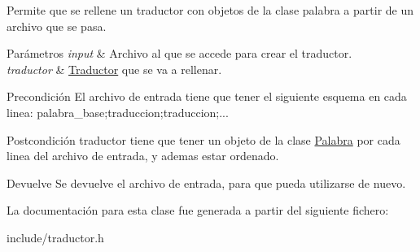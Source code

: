 \-Permite que se rellene un traductor con objetos de la clase palabra a partir de un archivo que se pasa. 
\begin{DoxyParams}{\-Parámetros}
{\em input} & \-Archivo al que se accede para crear el traductor. \\
\hline
{\em traductor} & \hyperlink{classTraductor}{\-Traductor} que se va a rellenar. \\
\hline
\end{DoxyParams}
\begin{DoxyPrecond}{\-Precondición}
\-El archivo de entrada tiene que tener el siguiente esquema en cada linea\-: palabra\-\_\-base;traduccion;traduccion;... 
\end{DoxyPrecond}
\begin{DoxyPostcond}{\-Postcondición}
traductor tiene que tener un objeto de la clase \hyperlink{classPalabra}{\-Palabra} por cada linea del archivo de entrada, y ademas estar ordenado. 
\end{DoxyPostcond}
\begin{DoxyReturn}{\-Devuelve}
\-Se devuelve el archivo de entrada, para que pueda utilizarse de nuevo. 
\end{DoxyReturn}


\-La documentación para esta clase fue generada a partir del siguiente fichero\-:\begin{DoxyCompactItemize}
\item 
include/traductor.\-h\end{DoxyCompactItemize}
